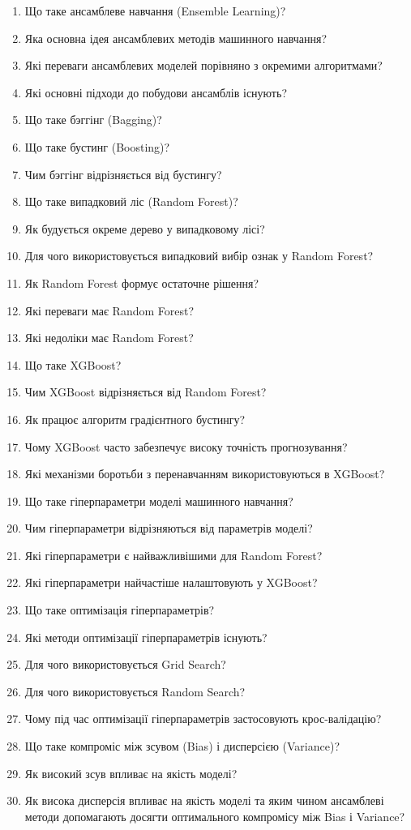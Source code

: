 \begin{enumerate}
\item Що таке ансамблеве навчання (Ensemble Learning)?
\item Яка основна ідея ансамблевих методів машинного навчання?
\item Які переваги ансамблевих моделей порівняно з окремими алгоритмами?
\item Які основні підходи до побудови ансамблів існують?
\item Що таке бэггінг (Bagging)?
\item Що таке бустинг (Boosting)?
\item Чим бэггінг відрізняється від бустингу?
\item Що таке випадковий ліс (Random Forest)?
\item Як будується окреме дерево у випадковому лісі?
\item Для чого використовується випадковий вибір ознак у Random Forest?
\item Як Random Forest формує остаточне рішення?
\item Які переваги має Random Forest?
\item Які недоліки має Random Forest?
\item Що таке XGBoost?
\item Чим XGBoost відрізняється від Random Forest?
\item Як працює алгоритм градієнтного бустингу?
\item Чому XGBoost часто забезпечує високу точність прогнозування?
\item Які механізми боротьби з перенавчанням використовуються в XGBoost?
\item Що таке гіперпараметри моделі машинного навчання?
\item Чим гіперпараметри відрізняються від параметрів моделі?
\item Які гіперпараметри є найважливішими для Random Forest?
\item Які гіперпараметри найчастіше налаштовують у XGBoost?
\item Що таке оптимізація гіперпараметрів?
\item Які методи оптимізації гіперпараметрів існують?
\item Для чого використовується Grid Search?
\item Для чого використовується Random Search?
\item Чому під час оптимізації гіперпараметрів застосовують крос-валідацію?
\item Що таке компроміс між зсувом (Bias) і дисперсією (Variance)?
\item Як високий зсув впливає на якість моделі?
\item Як висока дисперсія впливає на якість моделі та яким чином ансамблеві методи допомагають досягти оптимального компромісу між Bias і Variance?
\end{enumerate}



